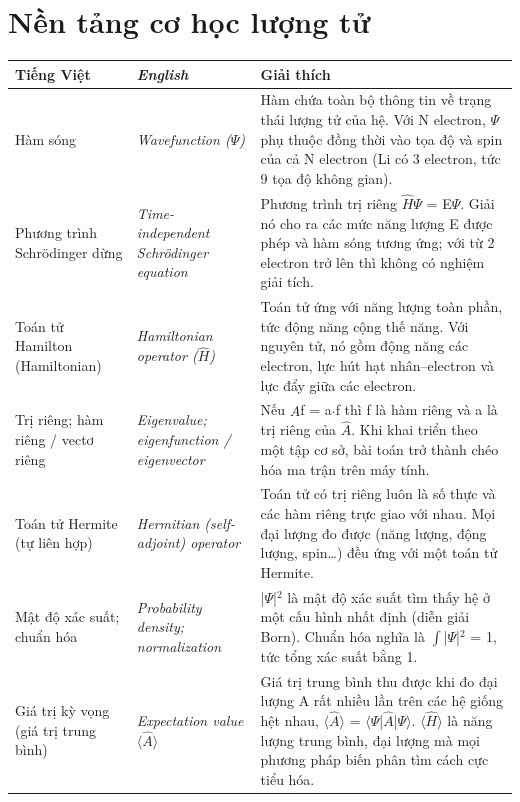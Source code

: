 \section*{Nền tảng cơ học lượng tử}
\begin{longtable}{@{}>{\raggedright\arraybackslash}p{}>{\raggedright\arraybackslash\itshape}p{}>{\raggedright\arraybackslash}p{}@{}}
\toprule \textbf{Tiếng Việt} & \textbf{\upshape English} & \textbf{Giải thích} \\ \midrule \endhead
Hàm sóng & Wavefunction ($\Psi$) & Hàm chứa toàn bộ thông tin về trạng thái lượng tử của hệ. Với N electron, $\Psi$ phụ thuộc đồng thời vào tọa độ và spin của cả N electron (Li có 3 electron, tức 9 tọa độ không gian). \\[2pt]
Phương trình Schrödinger dừng & Time-independent Schrödinger equation & Phương trình trị riêng $\hat H\Psi$ = E$\Psi$. Giải nó cho ra các mức năng lượng E được phép và hàm sóng tương ứng; với từ 2 electron trở lên thì không có nghiệm giải tích. \\[2pt]
Toán tử Hamilton (Hamiltonian) & Hamiltonian operator ($\hat H$) & Toán tử ứng với năng lượng toàn phần, tức động năng cộng thế năng. Với nguyên tử, nó gồm động năng các electron, lực hút hạt nhân–electron và lực đẩy giữa các electron. \\[2pt]
Trị riêng; hàm riêng / vectơ riêng & Eigenvalue; eigenfunction / eigenvector & Nếu $\hat A$f = a$\cdot$f thì f là hàm riêng và a là trị riêng của $\hat A$. Khi khai triển theo một tập cơ sở, bài toán trở thành chéo hóa ma trận trên máy tính. \\[2pt]
Toán tử Hermite (tự liên hợp) & Hermitian (self-adjoint) operator & Toán tử có trị riêng luôn là số thực và các hàm riêng trực giao với nhau. Mọi đại lượng đo được (năng lượng, động lượng, spin…) đều ứng với một toán tử Hermite. \\[2pt]
Mật độ xác suất; chuẩn hóa & Probability density; normalization & |$\Psi$|$^{2}$ là mật độ xác suất tìm thấy hệ ở một cấu hình nhất định (diễn giải Born). Chuẩn hóa nghĩa là $\int$|$\Psi$|$^{2}$ = 1, tức tổng xác suất bằng 1. \\[2pt]
Giá trị kỳ vọng (giá trị trung bình) & Expectation value $\langle\hat A\rangle$ & Giá trị trung bình thu được khi đo đại lượng A rất nhiều lần trên các hệ giống hệt nhau, $\langle\hat A\rangle$ = $\langle\Psi$|$\hat A$|$\Psi\rangle$. $\langle\hat H\rangle$ là năng lượng trung bình, đại lượng mà mọi phương pháp biến phân tìm cách cực tiểu hóa. \\[2pt]

\end{longtable}
